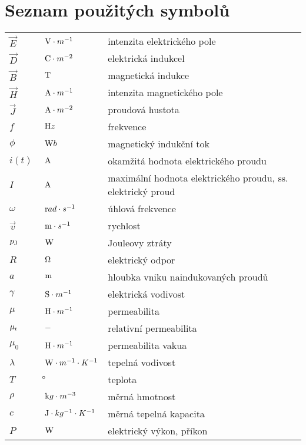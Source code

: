 \chapter*{Seznam použitých symbolů}
\begin{tabular}{lll}
	$\vec{E}$ & $\mathrm{\ V}\cdot m^{-1}$ & intenzita elektrického pole\\
	$\vec{D}$ & $\mathrm{\ C}\cdot m^{-2}$ & elektrická indukcel\\
	$\vec{B}$ & $\mathrm{\ T}$ & magnetická indukce\\
	$\vec{H}$ & $\mathrm{\ A}\cdot m^{-1}$ & intenzita magnetického pole\\
	$\vec{J}$ & $\mathrm{\ A}\cdot m^{-2}$ & proudová hustota\\	
	$f$ & $\mathrm{\ H}z$ & frekvence\\
	
	
	$\phi$ & $\mathrm{\ W}b$ & magnetický indukční tok\\
	$i(t)$ & $\mathrm{\ A}$ & okamžitá hodnota elektrického proudu\\
	$I$ & $\mathrm{\ A}$ & maximální hodnota elektrického proudu, ss. elektrický proud\\
	$\omega$ & $\mathrm{\ r}ad\cdot s^{-1}$ & úhlová frekvence\\

	$\vec{v}$ & $\mathrm{\ m}\cdot s^{-1}$ & rychlost\\

	$p_{\rm{J}}$ & $\mathrm{\ W}$ & Jouleovy ztráty\\
	$R$ & $\mathrm{\ \Omega}$ & elektrický odpor\\
	$a$ & $\mathrm{\ m}$ & hloubka vniku naindukovaných proudů\\
	$\gamma$ & $\mathrm{\ S}\cdot m^{-1}$ & elektrická vodivost\\
	$\mu$ & $\mathrm{\ H}\cdot m^{-1}$ & permeabilita\\
	$\mu_{\rm{r}}$ & $\mathrm{\ -}$ & relativní permeabilita\\
	$\mu_0$ & $\mathrm{\ H}\cdot m^{-1}$ & permeabilita vakua\\


	


	$\lambda$ & $\mathrm{\ W}\cdot m^{-1} \cdot K^{-1}$ & tepelná vodivost\\
	$T$ & $\unit \degree$ & teplota\\
	$\rho$ & $\mathrm{\ k}g\cdot m^{-3}$ & měrná hmotnost\\
	$c$ & $\mathrm{\ J}\cdot kg^{-1} \cdot K^{-1}$ & měrná tepelná kapacita\\
	$P$ & $\mathrm{\ W}$ & elektrický výkon, příkon\\
\end{tabular}